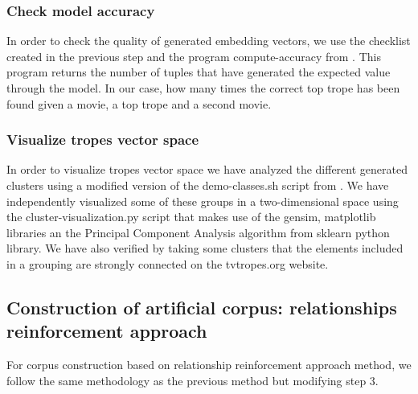 \documentclass[letterpaper]{article}
\begin{document}
	\subsubsection{Check model accuracy}
	In order to check the quality of generated embedding vectors,
        we use the checklist created in the previous step and the
        program compute-accuracy from \cite{git-hub-word2vec}. This
        program returns the number of tuples that have generated the
        expected value through the model. In our case, how many times
        the correct top trope has been found given a movie, a top
        trope and a second movie. %

        
	\subsubsection{Visualize tropes vector space} 
	In order to visualize tropes vector space we have analyzed the different generated clusters using a modified version of the demo-classes.sh script from \cite{git-hub-word2vec}. 
	We have independently visualized some of these groups in a
        two-dimensional space using the cluster-visualization.py
        script that makes use of the gensim, matplotlib libraries an
        the Principal Component Analysis algorithm from sklearn python
        library. We have also verified by taking some clusters that
        the elements included in a grouping are strongly connected on
        the tvtropes.org website. %
	
	\subsection{Construction of artificial corpus: relationships
          reinforcement approach}
	For corpus construction based on relationship reinforcement approach method, we follow the same methodology as the previous method but modifying step 3.
	
\end{document}
